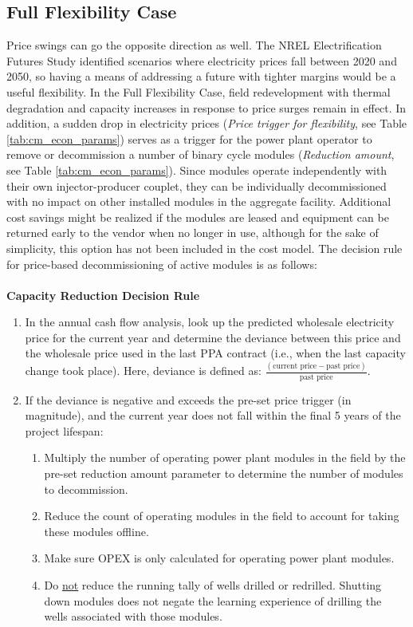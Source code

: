 \subsection{Full Flexibility Case}\label{ch4:flex_reduce_case}
Price swings can go the opposite direction as well. The NREL Electrification Futures Study \citep{murphy_electrification_2021} identified scenarios where electricity prices fall between 2020 and 2050, so having a means of addressing a future with tighter margins would be a useful flexibility. In the Full Flexibility Case, field redevelopment with thermal degradation and capacity increases in response to price surges remain in effect. In addition, a sudden drop in electricity prices (\textit{Price trigger for flexibility}, see Table \ref{tab:cm_econ_params}) serves as a trigger for the power plant operator to remove or decommission a number of binary cycle modules (\textit{Reduction amount}, see Table \ref{tab:cm_econ_params}). Since modules operate independently with their own injector-producer couplet, they can be individually decommissioned with no impact on other installed modules in the aggregate facility. Additional cost savings might be realized if the modules are leased and equipment can be returned early to the vendor when no longer in use, although for the sake of simplicity, this option has not been included in the cost model. The decision rule for price-based decommissioning of active modules is as follows:
\\
\\
\textbf{Capacity Reduction Decision Rule}\label{ch4:dr_reduce}
\begin{enumerate}
    \item In the annual cash flow analysis, look up the predicted wholesale electricity price for the current year and determine the deviance between this price and the wholesale price used in the last PPA contract (i.e., when the last capacity change took place). Here, deviance is defined as: \(\frac{(\text{current price} - \text{past price})}{\text{past price}}\).
    \item If the deviance is negative and exceeds the pre-set price trigger (in magnitude), and the current year does not fall within the final 5 years of the project lifespan:
    \begin{enumerate}
        \item Multiply the number of operating power plant modules in the field by the pre-set reduction amount parameter to determine the number of modules to decommission.
        \item Reduce the count of operating modules in the field to account for taking these modules offline.
        \item Make sure OPEX is only calculated for operating power plant modules.
        \item Do \underline{not} reduce the running tally of wells drilled or redrilled. Shutting down modules does not negate the learning experience of drilling the wells associated with those modules.
    \end{enumerate}
\end{enumerate}

